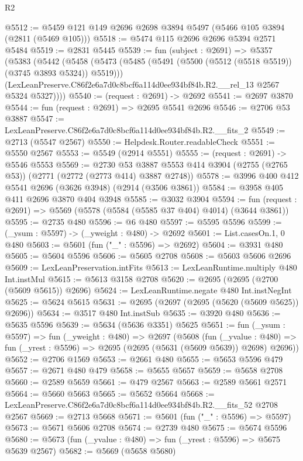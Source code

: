 \begin{lexlean}{R2}
\begin{coremodule}
@5512 := @5459 @121 @149 @2696 @2698 @3894 @5497 (@5466 @105 @3894 (@2811 (@5469 @105)))
@5518 := @5474 @115 @2696 @2696 @5394 @2571 @5484
@5519 := @2831 @5445
@5539 := fun (subject : @2691) =>
  @5357
    (@5383
      (@5442
        (@5458
          (@5473 (@5485 (@5491 (@5500 (@5512 (@5518 @5519)) (@3745 @3893 @5324)) @5519)))
          (LexLeanPreserve.C86f2e6a7d0c8bcf6a114d0ee934bf84b.R2.__rel_13 @2567 @5324 @5327))))
@5540 := (request : @2691) -> @2692
@5541 := @2697 @3870
@5544 := fun (request : @2691) => @2695 @5541 @2696
@5546 := @2706 @53 @3887
@5547 := LexLeanPreserve.C86f2e6a7d0c8bcf6a114d0ee934bf84b.R2.__fits_2
@5549 := @2713 (@5547 @2567)
@5550 := Helpdesk.Router.readableCheck
@5551 := @5550 @2567
@5553 := @5549 (@2914 @5551)
@5555 := (request : @2691) -> @5546 @5553
@5569 := @2730
    @53
    @3887
    @5553
    @414
    @3904
    (@2755 (@2765 @53))
    (@2771 (@2772 (@2773 @414) @3887 @2748))
@5578 := @3996 @400 @412 @5541 @2696 (@3626 @3948) (@2914 (@3506 @3861))
@5584 := @3958 @405 @411 @2696 @3870 @404 @3948
@5585 := @3032 @3904
@5594 := fun (request : @2691) => @5569 (@5578 (@5584 (@5585 @37 @404) @4014) (@3644 @3861))
@5595 := @2735 @480
@5596 := @6 @480
@5597 := @5595 @5596
@5599 := (_ysum : @5597) -> (_yweight : @480) -> @2692
@5601 := List.casesOn.{1, 0} @480
@5603 := @5601 (fun ("_" : @5596) => @2692)
@5604 := @3931 @480
@5605 := @5604 @5596
@5606 := @5605 @2708
@5608 := @5603 @5606 @2696
@5609 := LexLeanPreservation.intFits
@5613 := LexLeanRuntime.multiply @480 Int.instMul
@5615 := @5613 @3158 @2708
@5620 := @2695 (@2695 (@2700 (@5609 @5615)) @2696)
@5624 := LexLeanRuntime.negate @480 Int.instNegInt
@5625 := @5624 @5615
@5631 := @2695 (@2697 (@2695 (@5620 (@5609 @5625)) @2696))
@5634 := @3517 @480 Int.instSub
@5635 := @3920 @480
@5636 := @5635 @5596
@5639 := @5634 (@5636 @3351) @5625
@5651 := fun (_ysum : @5597) =>
  fun (_yweight : @480) =>
  @2697
    (@5608
      (fun (_yvalue : @480) =>
      fun (_yrest : @5596) => @2695 (@2695 (@5631 (@5609 @5639)) @2698) @2696))
@5652 := @2706 @1569
@5653 := @2661 @480
@5655 := @5653 @5596 @479
@5657 := @2671 @480 @479
@5658 := @5655 @5657
@5659 := @5658 @2708
@5660 := @2589 @5659
@5661 := @479 @2567
@5663 := @2589 @5661 @2571
@5664 := @5660 @5663
@5665 := @5652 @5664
@5668 := LexLeanPreserve.C86f2e6a7d0c8bcf6a114d0ee934bf84b.R2.__fits_52 @2708 @2567
@5669 := @2713 @5668
@5671 := @5601 (fun ("_" : @5596) => @5597)
@5673 := @5671 @5606 @2708
@5674 := @2739 @480
@5675 := @5674 @5596
@5680 := @5673 (fun (_yvalue : @480) => fun (_yrest : @5596) => @5675 @5639 @2567)
@5682 := @5669 (@5658 @5680)

\end{coremodule}
\end{lexlean}
